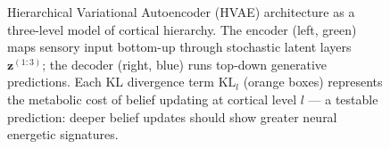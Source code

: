 \documentclass[12pt,a4paper]{article}
\theoremstyle{plain}
\theoremstyle{definition}
\theoremstyle{remark}
\begin{document}
\begin{figure}[H]
\caption{Hierarchical Variational Autoencoder (HVAE) architecture as a three-level model of cortical hierarchy.  The encoder (left, green) maps sensory input bottom-up through stochastic latent layers $\mathbf{z}^{(1:3)}$; the decoder (right, blue) runs top-down generative predictions.  Each KL divergence term $\mathrm{KL}_l$ (orange boxes) represents the metabolic cost of belief updating at cortical level $l$ — a testable prediction: deeper belief updates should show greater neural energetic signatures.}
\label{fig:hvae}
\end{figure}
\end{document}

